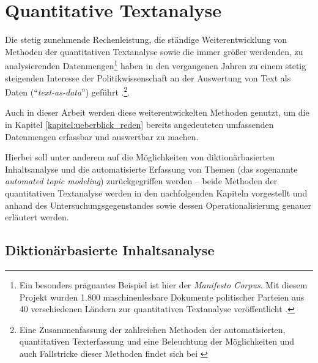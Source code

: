 \documentclass[12pt, 
    twoside=false, 
    bibliography=totoc, 
    numbers=endperiod, 
    headings=normal, 
    toc=chapterentrydotfill
    ]{scrbook}
\begin{document}
\section{Quantitative Textanalyse}

Die stetig zunehmende Rechenleistung, die ständige Weiterentwicklung von Methoden der quantitativen Textanalyse sowie die immer größer werdenden, zu analysierenden Datenmengen\footnote{Ein besonders prägnantes Beispiel ist hier der \emph{Manifesto Corpus}. Mit diesem Projekt wurden 1.800 maschinenlesbare Dokumente politischer Parteien aus 40 verschiedenen Ländern zur quantitativen Textanalyse veröffentlicht \parencite{merz_2016}.} haben in den vergangenen Jahren zu einem stetig steigenden Interesse der Politikwissenschaft an der Auswertung von Text als Daten (\enquote{\emph{text-as-data}}) geführt \parencite[vgl.][]{wilkerson_2017}.\footnote{Eine Zusammenfassung der zahlreichen Methoden der automatisierten, quantitativen Texterfassung und eine Beleuchtung der Möglichkeiten und auch Fallstricke dieser Methoden findet sich bei \textcite{grimmer_2013}}. 

Auch in dieser Arbeit werden diese weiterentwickelten Methoden genutzt, um die in Kapitel \ref{kapitel:ueberblick_reden} bereits angedeuteten umfassenden Datenmengen  erfassbar und auswertbar zu machen.

Hierbei soll unter anderem auf die Möglichkeiten von diktionärbasierten Inhaltsanalyse und die automatisierte Erfassung von Themen (das sogenannte \emph{automated topic modeling}) zurückgegriffen werden -- beide Methoden der quantitativen Textanalyse werden in den nachfolgenden Kapiteln vorgestellt und anhand des Untersuchungsgegenstandes sowie dessen Operationalisierung genauer erläutert werden.


\subsection{Diktionärbasierte Inhaltsanalyse}\label{kapitel:diktionär}
\end{document}
